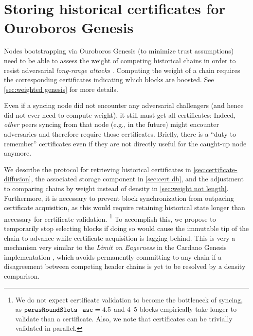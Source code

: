 \section{Storing historical certificates for Ouroboros Genesis}\label{sec:storing historical certs}

Nodes bootstrapping via Ouroboros Genesis (to minimize trust assumptions) need to be able to assess the weight of competing historical chains in order to resist adversarial \emph{long-range attacks} \parencite{genesis-implementation-documentation}.
Computing the weight of a chain requires the corresponding certificates indicating which blocks are boosted.
See \cref{sec:weighted genesis} for more details.

Even if a syncing node did not encounter any adversarial challengers (and hence did not ever need to compute weight), it still must get all certificates:
Indeed, \emph{other} peers syncing from that node (e.g., in the future) might encounter adversaries and therefore require those certificates.
Briefly, there is a \enquote{duty to remember} certificates even if they are not directly useful for the caught-up node anymore.

We describe the protocol for retrieving historical certificates in \cref{sec:certificate-diffusion}, the associated storage component in \cref{sec:cert db}, and the adjustment to comparing chains by weight instead of density in \cref{sec:weight not length}.
Furthermore, it is necessary to prevent block synchronization from outpacing certificate acquisition, as this would require retaining historical state longer than necessary for certificate validation.%
\footnote{We do not expect certificate validation to become the bottleneck of syncing, as $\mathtt{perasRoundSlots} \cdot \mathtt{asc} = \num{4.5}$ and \numrange{4}{5} blocks empirically take longer to validate than a certificate.
  Also, we note that certificates can be trivially validated in parallel.}
To accomplish this, we propose to temporarily stop selecting blocks if doing so would cause the immutable tip of the chain to advance while certificate acquisition is lagging behind.
This is very a mechanism very similar to the \emph{Limit on Eagerness} in the Cardano Genesis implementation \parencite{genesis-implementation-documentation}, which avoids permanently committing to any chain if a disagreement between competing header chains is yet to be resolved by a density comparison.

